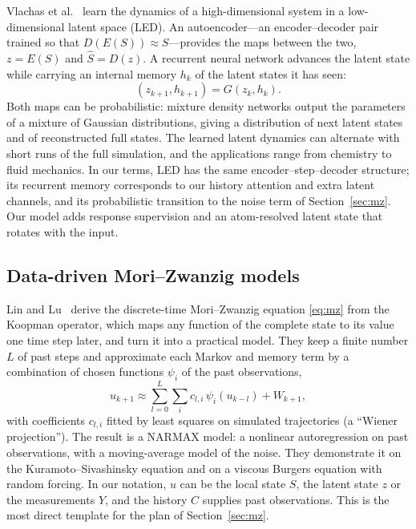 \documentclass[11pt,a4paper]{article}
\numberwithin{equation}{section}
\begin{document}
Vlachas et al.~\cite{led} learn the dynamics of a high-dimensional system in a
low-dimensional latent space (LED). An autoencoder---an encoder--decoder pair trained
so that $D(E(S))\approx S$---provides the maps between the two, $z=E(S)$ and
$\widehat S=D(z)$. A recurrent neural network advances the latent state while
carrying an internal memory $h_k$ of the latent states it has seen:
\begin{equation}
(z_{k+1},h_{k+1})=G(z_k,h_k).
\end{equation}
Both maps can be probabilistic: mixture density networks output the parameters of a
mixture of Gaussian distributions, giving a distribution of next latent states and
of reconstructed full states. The learned latent dynamics can alternate with short
runs of the full simulation, and the applications range from chemistry to fluid
mechanics. In our terms, LED has the same encoder--step--decoder structure; its
recurrent memory corresponds to our history attention and extra latent channels,
and its probabilistic transition to the noise term of Section~\ref{sec:mz}. Our model
adds response supervision and an atom-resolved latent state that rotates with the
input.

\subsection{Data-driven Mori--Zwanzig models}

Lin and Lu~\cite{linlu} derive the discrete-time Mori--Zwanzig equation
\eqref{eq:mz} from the Koopman operator, which maps any function of the complete
state to its value one time step later, and turn it into a practical model. They
keep a finite number $L$ of past steps and approximate each Markov and memory term
by a combination of chosen functions $\psi_i$ of the past observations,
\begin{equation}
u_{k+1}\approx\sum_{l=0}^{L}\sum_i c_{l,i}\,\psi_i(u_{k-l})+W_{k+1},
\end{equation}
with coefficients $c_{l,i}$ fitted by least squares on simulated trajectories (a
``Wiener projection''). The result is a NARMAX model: a nonlinear autoregression on
past observations, with a moving-average model of the noise. They demonstrate it on
the Kuramoto--Sivashinsky equation and on a viscous Burgers equation with random
forcing. In our notation, $u$ can be the local state $S$, the latent state $z$ or the
measurements $Y$, and the history $C$ supplies past observations. This is the most
direct template for the plan of Section~\ref{sec:mz}.
\end{document}
